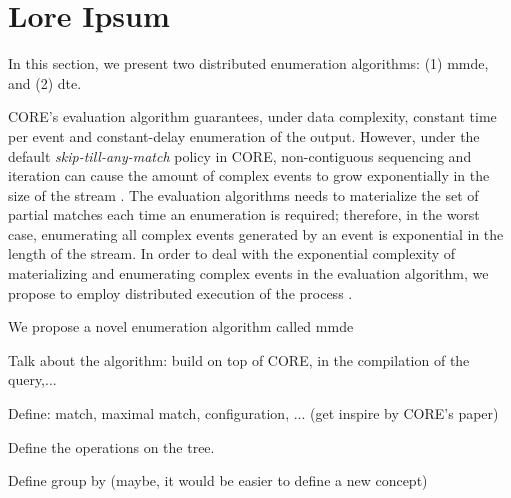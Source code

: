 \chapter{Lore Ipsum}\label{chapter}


In this section, we present two distributed enumeration algorithms: (1) \acrfull{mmde}, and (2) \acrfull{dte}.

CORE's evaluation algorithm guarantees, under data complexity, constant time per event and constant-delay enumeration of the output. However, under the default \emph{skip-till-any-match} \cite{skip-till-any-match} policy in CORE, non-contiguous sequencing and iteration can cause the amount of complex events to grow exponentially in the size of the stream \cite{formal-framework-cer}. The evaluation algorithms needs to materialize the set of partial matches each time an enumeration is required; therefore, in the worst case, enumerating all complex events generated by an event is exponential in the length of the stream. In order to deal with the exponential complexity of materializing and enumerating complex events in the evaluation algorithm, we propose to employ distributed execution of the process \cite{distributed-computing-book}.


We propose a novel enumeration algorithm called \acrfull{mmde}

Talk about the algorithm: build on top of CORE, in the compilation of the query,...

Define: match, maximal match, configuration, ... (get inspire by CORE's paper)

Define the operations on the tree.

Define group by (maybe, it would be easier to define a new concept)

